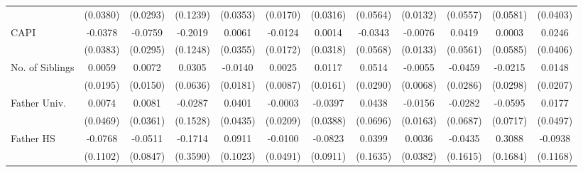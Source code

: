\begin{table}[htbp]
\begin{tabular}{l*{11}{c}}
            &    (0.0380)         &    (0.0293)         &    (0.1239)         &    (0.0353)         &    (0.0170)         &    (0.0316)         &    (0.0564)         &    (0.0132)         &    (0.0557)         &    (0.0581)         &    (0.0403)         \\
\addlinespace
CAPI        &     -0.0378         &     -0.0759\sym{*}  &     -0.2019         &      0.0061         &     -0.0124         &      0.0014         &     -0.0343         &     -0.0076         &      0.0419         &      0.0003         &      0.0246         \\
            &    (0.0383)         &    (0.0295)         &    (0.1248)         &    (0.0355)         &    (0.0172)         &    (0.0318)         &    (0.0568)         &    (0.0133)         &    (0.0561)         &    (0.0585)         &    (0.0406)         \\
\addlinespace
No. of Siblings&      0.0059         &      0.0072         &      0.0305         &     -0.0140         &      0.0025         &      0.0117         &      0.0514         &     -0.0055         &     -0.0459         &     -0.0215         &      0.0148         \\
            &    (0.0195)         &    (0.0150)         &    (0.0636)         &    (0.0181)         &    (0.0087)         &    (0.0161)         &    (0.0290)         &    (0.0068)         &    (0.0286)         &    (0.0298)         &    (0.0207)         \\
\addlinespace
Father Univ.&      0.0074         &      0.0081         &     -0.0287         &      0.0401         &     -0.0003         &     -0.0397         &      0.0438         &     -0.0156         &     -0.0282         &     -0.0595         &      0.0177         \\
            &    (0.0469)         &    (0.0361)         &    (0.1528)         &    (0.0435)         &    (0.0209)         &    (0.0388)         &    (0.0696)         &    (0.0163)         &    (0.0687)         &    (0.0717)         &    (0.0497)         \\
\addlinespace
Father HS   &     -0.0768         &     -0.0511         &     -0.1714         &      0.0911         &     -0.0100         &     -0.0823         &      0.0399         &      0.0036         &     -0.0435         &      0.3088         &     -0.0938         \\
            &    (0.1102)         &    (0.0847)         &    (0.3590)         &    (0.1023)         &    (0.0491)         &    (0.0911)         &    (0.1635)         &    (0.0382)         &    (0.1615)         &    (0.1684)         &    (0.1168)         \\

\end{tabular}
\end{table}
